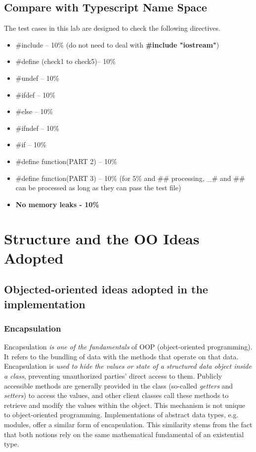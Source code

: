 \documentclass[a4paper]{report}
\begin{document}
\section{Compare with Typescript Name Space}
The test cases in this lab are designed to check the following directives.
\begin{itemize}
\item \#include – 10\% (do not need to deal with \textbf{\#include "iostream"})
\item \#define (check1 to check5)– 10\%
\item \#undef – 10\%
\item \#ifdef – 10\%
\item \#else – 10\%
\item \#ifndef – 10\%
\item \#if – 10\%
\item \#define function(PART 2) – 10\%
\item \#define function(PART 3) – 10\% (for 5\% and \#\# processing, \_\# and \#\# can be processed as long as they can pass the test file)
\item \textbf{No memory leaks - 10\%}
\end{itemize}

\chapter{Structure and  the OO Ideas Adopted}
\section{Objected-oriented ideas adopted in the implementation}
\subsection{Encapsulation}
Encapsulation \emph{is one of the fundamentals} of OOP (object-oriented programming). It refers to the bundling of data with the methods that operate on that data. Encapsulation is \emph{used to hide the values or state of a structured data object inside a class}, preventing unauthorized parties' direct access to them. Publicly accessible methods are generally provided in the class (so-called \emph{getters} and \emph{setters}) to access the values, and other client classes call these methods to retrieve and modify the values within the object. 
This mechanism is not unique to object-oriented programming. Implementations of abstract data types, e.g. modules, offer a similar form of encapsulation. This similarity stems from the fact that both notions rely on the same mathematical fundamental of an existential type.
\end{document}
